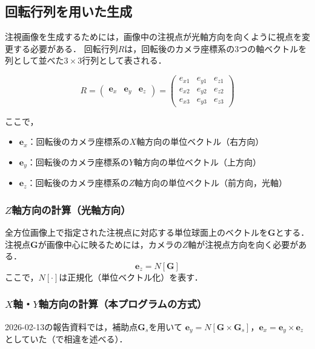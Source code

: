\documentclass{ltjsarticle}          %
\begin{document}
\subsection{回転行列を用いた生成\cite{bib_2}}
注視画像を生成するためには，画像中の注視点が光軸方向を向くように視点を変更する必要がある．
回転行列$R$は，回転後のカメラ座標系の3つの軸ベクトルを列として並べた$3 \times 3$行列として表される．

\begin{equation}
R = \begin{pmatrix}
\bm{e}_x & \bm{e}_y & \bm{e}_z
\end{pmatrix}
= \begin{pmatrix}
e_{x1} & e_{y1} & e_{z1} \\
e_{x2} & e_{y2} & e_{z2} \\
e_{x3} & e_{y3} & e_{z3}
\end{pmatrix}
\label{eq:rotation_matrix}
\end{equation}

ここで，
\begin{itemize}
  \item $\bm{e}_x$：回転後のカメラ座標系の$X$軸方向の単位ベクトル（右方向）
  \item $\bm{e}_y$：回転後のカメラ座標系の$Y$軸方向の単位ベクトル（上方向）
  \item $\bm{e}_z$：回転後のカメラ座標系の$Z$軸方向の単位ベクトル（前方向，光軸）
\end{itemize}

\subsubsection{$Z$軸方向の計算（光軸方向）}
全方位画像上で指定された注視点に対応する単位球面上のベクトルを$\bm{G}$とする．
注視点$\bm{G}$が画像中心に映るためには，カメラの$Z$軸が注視点方向を向く必要がある．
\begin{equation}
  \bm{e}_z = N[\bm{G}]
  \label{eq:ez}
\end{equation}
ここで，$N[\cdot]$は正規化（単位ベクトル化）を表す．

\subsubsection{$X$軸・$Y$軸方向の計算（本プログラムの方式）}
2026-02-13の報告資料では，補助点$\bm{G}_s$を用いて
$\bm{e}_y = N[\bm{G} \times \bm{G}_s]$，$\bm{e}_x = \bm{e}_y \times \bm{e}_z$
としていた（で相違を述べる）．
\end{document}
